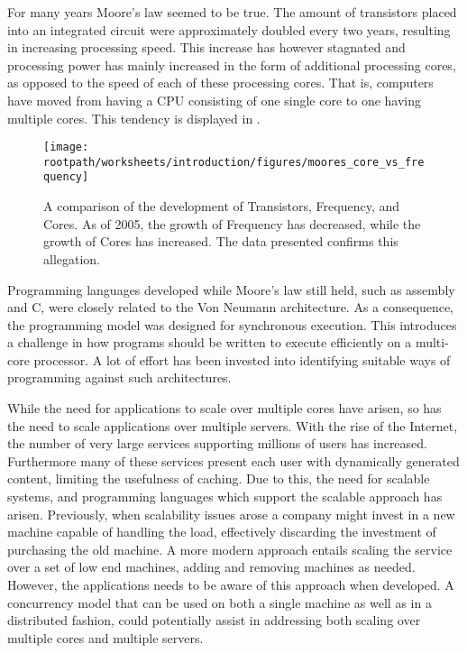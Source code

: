 \makeatletter {}\makeatother
{}\label{chap:introduction}
%
For many years Moore's law\cite{moore1965cramming} seemed to be true. The amount of transistors placed into an integrated circuit were approximately doubled every two years, resulting in increasing processing speed. This increase has however stagnated and processing power has mainly increased in the form of additional processing cores, as opposed to the speed of each of these processing cores\cite[p. 22]{sevenModels}. That is, computers have moved from having a \ac{CPU} consisting of one single core to one having multiple cores. This tendency is displayed in .

\begin{figure}[htbp]
\centering
 \texttt{[image: \\rootpath/worksheets/introduction/figures/moores\_core\_vs\_frequency]} 
 \caption{A comparison of the development of Transistors, Frequency, and Cores\cite{isca2009}. As of 2005, the growth of Frequency has decreased, while the growth of Cores has increased. The data presented confirms this allegation.}
\label{fig:moores_in_reality}
\end{figure}

Programming languages developed while Moore's law still held, such as assembly and C, were closely related to the Von Neumann architecture. As a consequence, the programming model was designed for synchronous execution. This introduces a challenge in how programs should be written to execute efficiently on a multi-core processor. A lot of effort has been invested into identifying suitable ways of programming against such architectures.

While the need for applications to scale over multiple cores have arisen, so has the need to scale applications over multiple servers. With the rise of the Internet, the number of very large services supporting millions of users has increased. Furthermore many of these services present each user with dynamically generated content, limiting the usefulness of caching. Due to this, the need for scalable systems, and programming languages which support the scalable approach has arisen. Previously, when scalability issues arose a company might invest in a new machine capable of handling the load, effectively discarding the investment of purchasing the old machine\cite[p. 2]{haller2007actors}. A more modern approach entails scaling the service over a set of low end machines, adding and removing machines as needed. However, the applications needs to be aware of this approach when developed. A concurrency model that can be used on both a single machine as well as in a distributed fashion, could potentially assist in addressing both scaling over multiple cores and multiple servers.

